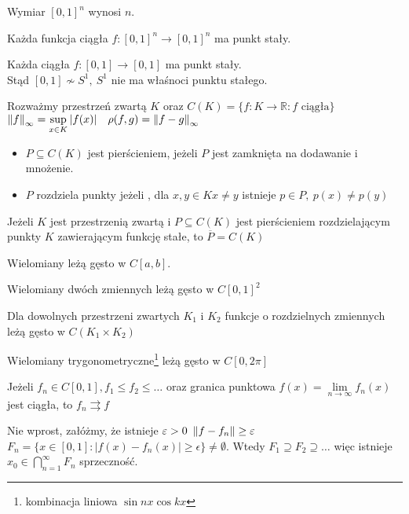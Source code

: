 \begin{tw} Wymiar $[0,1]^n$ wynosi $n$. \end{tw} 
\begin{tw}[Brouwera] 
    Każda funkcja ciągła $f: [0,1]^n \to [0,1]^n$ ma punkt stały. 
\end{tw} 
\begin{uw} 
    Każda ciągła $f: [0,1] \to [0,1]$ ma punkt stały. \\ 
    Stąd $[0,1] \nsim S^1,\ S^1$ nie ma właśnoci punktu stałego.
\end{uw} 
Rozważmy przestrzeń zwartą $K$ oraz $C(K) = \{f: K \to \mathbb R: f \text{ ciągła}\}$ \\ 
$\left\lVert f\right\rVert_\infty = \sup\limits_{x \in K} |f(x)| \quad \rho(f,g) = \left\lVert f-g\right\rVert_\infty$
\begin{df} \hfill 
    \begin{itemize} 
        \item $P \subseteq C(K)$ jest pierścieniem, jeżeli $P$ jest zamknięta na dodawanie
            i mnożenie.
        \item $P$ rozdziela punkty jeżeli , dla $x,y \in K 
            x \neq y$ istnieje $p \in P,\ p(x) \neq p(y)$
    \end{itemize} 
\end{df} 
\begin{tw}
    Jeżeli $K$ jest przestrzenią zwartą i $P \subseteq C(K)$ jest pierścieniem 
    rozdzielającym punkty $K$ zawierającym funkcję stałe, to $\overline P = C(K)$
\end{tw} 
\begin{wn}[Weiestrass] Wielomiany leżą gęsto w $C[a,b]$. \end{wn} 
\begin{wn} Wielomiany dwóch zmiennych leżą gęsto w $C[0,1]^2$ \end{wn} 
\begin{wn} Dla dowolnych przestrzeni zwartych $K_1$ i $K_2$ funkcje o rozdzielnych
zmiennych leżą gęsto w $C(K_1 \times K_2)$ \end{wn}
\begin{wn} Wielomiany trygonometryczne\footnote{kombinacja liniowa $\sin nx \cos kx$}
    leżą gęsto w $C[0,2\pi]$ \end{wn} 
\begin{lem}[Diniego]
    Jeżeli $f_n \in C[0,1], f_1 \le f_2 \le \ldots$ oraz granica punktowa 
    $f(x) = \lim\limits_{n \to \infty} f_n(x) $ jest ciągła, to $f_n \rightrightarrows f$
    \begin{dd} 
        Nie wprost, załóżmy, że istnieje $\varepsilon > 0 \ \left\lVert f-f_n\right\rVert \ge \varepsilon$
        $F_n = \{x \in [0,1]: |f(x)-f_n(x)| \ge \epsilon \} \neq \emptyset$. 
        Wtedy $F_1 \supseteq F_2 \supseteq \ldots$ więc istnieje $x_0 \in \bigcap\limits
        _{n=1}^\infty F_n$ sprzeczność.
    \end{dd} 
\end{lem} 
